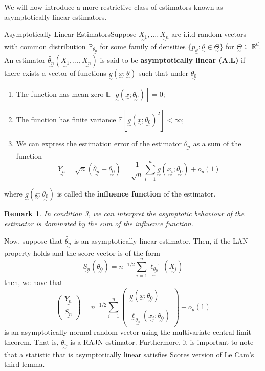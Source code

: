 \documentclass[twoside]{article}
\newtheorem{remark}[theorem]{Remark}
\newcommand{\prob}{\mathbb{P}}
\newcommand{\utilde}{\underset{\sim}}
\begin{document}
We will now introduce a more restrictive class of estimators known as asymptotically linear estimators.

\begin{definition_exam}{Asymptotically Linear Estimators}{}Suppose $\utilde{X_1},...,\utilde{X_n}$ are i.i.d random vectors with common distribution $\prob_{\utilde{\theta_0}}$ for some family of densities $\{p_{\utilde{\theta}}: \utilde{\theta} \in \utilde{\Theta}\}$ for $\utilde{\Theta} \subseteq \mathbb{R}^d.$ An estimator $\tilde{\utilde{\theta_n}}(\utilde{X_1},...,\utilde{X_n})$ is said to be \textbf{asymptotically linear (A.L)} if there exists a vector of functions $\utilde{g}(\utilde{x}; \utilde{\theta})$ such that under $\utilde{\theta_0}$ 
\begin{enumerate}
\item The function has mean zero $\mathbb{E}[\utilde{g}(\utilde{x}; \utilde{\theta_0})] = 0;$
\item The function has finite variance $\mathbb{E}[\utilde{g}(\utilde{x}; \utilde{\theta_0})^2] < \infty;$
\item We can express the estimation error of the estimator $\tilde{\utilde{\theta_n}}$ as a sum of the function $$\utilde{Y_n} = \sqrt{n}(\tilde{\utilde{\theta_n}} - \utilde{\theta_0}) = \frac{1}{\sqrt{n}}\sum_{i=1}^{n}\utilde{g}(\utilde{x_i}; \utilde{\theta_0}) + o_p(1)$$
\end{enumerate}
where $\utilde{g}(\utilde{x}; \utilde{\theta_0})$ is called the \textbf{influence function} of the estimator. 
\end{definition_exam}
\begin{remark}
In condition 3, we can interpret the asymptotic behaviour of the estimator is dominated by the sum of the influence function.
\end{remark}

Now, suppose that $\tilde{\utilde{\theta_n}}$ is an asymptotically linear estimator. Then, if the LAN property holds and the score vector is of the form 
$$
\utilde{S_n}(\utilde{\theta_0}) = n^{-1/2}\sum_{i=1}^{n}\utilde{\ell_{\utilde{\theta_0}}}^{\circ}(\utilde{X_i})
$$
then, we have that 
$$
\begin{pmatrix}
\utilde{Y_n}\\
\utilde{S_n}
\end{pmatrix}
= n^{-1/2}
\sum_{i=1}^{n}
\begin{pmatrix}
\utilde{g}(\utilde{x}; \utilde{\theta_0})\\\\
\utilde{\ell}_{\utilde{\theta_{0}}}^{\circ}(\utilde{x_i}; \utilde{\theta_0})
\end{pmatrix}
+
o_p(1)
$$
is an asymptotically normal random-vector using the multivariate central limit theorem. That is, $\tilde{\utilde{\theta_n}}$ is a RAJN estimator. Furthermore, it is important to note that a statistic that is asymptotically linear satisfies Scores version of Le Cam's third lemma.
\end{document}
